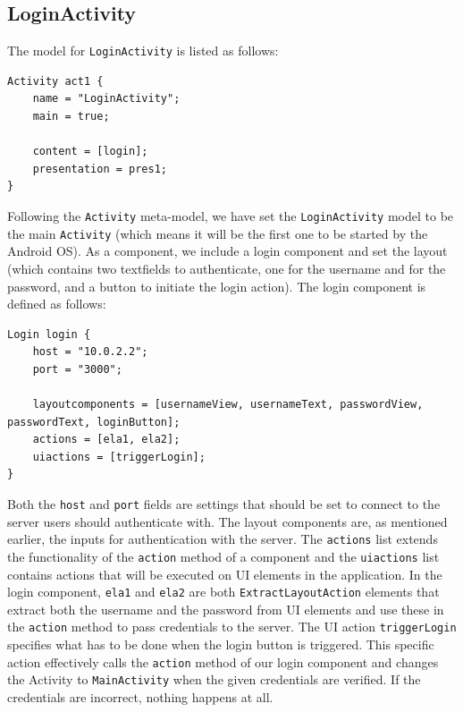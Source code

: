 \subsection{LoginActivity}

The model for \texttt{LoginActivity} is listed as follows:

\begin{lstlisting}[label=login-model,caption=LoginActivity model, captionpos=t]
Activity act1 {
	name = "LoginActivity";
	main = true;

	content = [login];
	presentation = pres1;
}
\end{lstlisting}
Following the \texttt{Activity} meta-model, we have set the \texttt{LoginActivity} model to be the main \texttt{Activity} (which means it will be the first one to be started by the Android OS). As a component, we include a login component and set the layout (which contains two textfields to authenticate, one for the username and for the password, and a button to initiate the login action). The login component is defined as follows:

\begin{lstlisting}[label=logincomponent-model,caption=Login component model, captionpos=t]
Login login {
	host = "10.0.2.2";
	port = "3000";

	layoutcomponents = [usernameView, usernameText, passwordView, passwordText, loginButton];
	actions = [ela1, ela2];
	uiactions = [triggerLogin];
}
\end{lstlisting}
Both the \texttt{host} and \texttt{port} fields are settings that should be set to connect to the server users should authenticate with. The layout components are, as mentioned earlier, the inputs for authentication with the server. The \texttt{actions} list  extends the functionality of the \texttt{action} method of a component and the \texttt{uiactions} list contains actions that will be executed on UI elements in the application. In the login component, \texttt{ela1} and \texttt{ela2} are both \texttt{ExtractLayoutAction} elements that extract both the username and the password from UI elements and use these in the \texttt{action} method to pass credentials to the server. The UI action \texttt{triggerLogin} specifies what has to be done when the login button is triggered. This specific action effectively calls the \texttt{action} method of our login component and changes the Activity to \texttt{MainActivity} when the given credentials are verified. If the credentials are incorrect, nothing happens at all.

